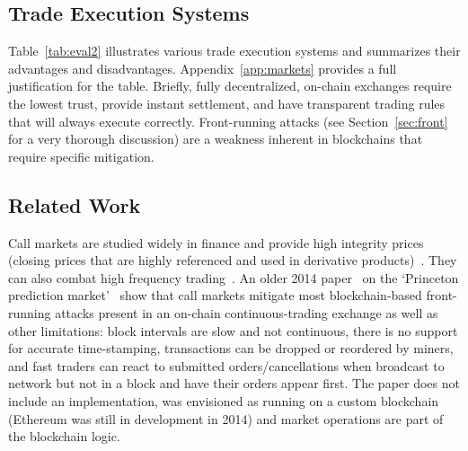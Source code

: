 \subsection{Trade Execution Systems}



Table~\ref{tab:eval2} illustrates various trade execution systems and summarizes their advantages and disadvantages. Appendix~\ref{app:markets} provides a full justification for the table. Briefly, fully decentralized, on-chain exchanges require the lowest trust, provide instant settlement, and have transparent trading rules that will always execute correctly. Front-running attacks (see Section~\ref{sec:front} for a very thorough discussion) are a weakness inherent in blockchains that require specific mitigation.  


\subsection{Related Work}

Call markets are studied widely in finance and provide high integrity prices (\eg closing prices that are highly referenced and used in derivative products)~\cite{HS04,PS03,FH21}. They can also combat high frequency trading~\cite{budish2015high,aquilina2020quantifying}. An older 2014 paper~\cite{clark2014decentralizing} on the `Princeton prediction market'~\cite{Bra13} show that call markets  mitigate most blockchain-based front-running attacks present in an on-chain continuous-trading exchange as well as other limitations: block intervals are slow and not continuous, there is no support for accurate time-stamping, transactions can be dropped or reordered by miners, and fast traders can react to submitted orders/cancellations when broadcast to network but not in a block and have their orders appear first. The paper does not include an implementation, was envisioned as running on a custom blockchain (Ethereum was still in development in 2014) and market operations are part of the blockchain logic. 



